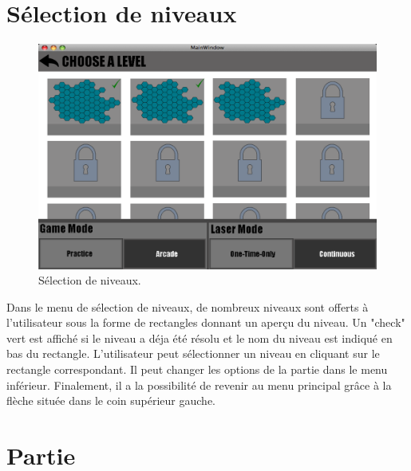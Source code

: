 \documentclass[]{article}
\begin{document}
\newpage
\section{Sélection de niveaux}\label{sec:select}

\begin{figure}[!htb]
\begin{center}
  \includegraphics[width=\textwidth]{Select.png}
  \caption{Sélection de niveaux.}\label{fig:select}
\end{center}
\end{figure}

Dans le menu de sélection de niveaux, de nombreux niveaux sont offerts à l'utilisateur sous la forme de rectangles donnant un aperçu du niveau. Un "check" vert est affiché si le niveau a déja été résolu et le nom du niveau est indiqué en bas du rectangle. L'utilisateur peut sélectionner un niveau en cliquant sur le rectangle correspondant. Il peut changer les options de la partie dans le menu inférieur. Finalement, il a la possibilité de revenir au menu principal grâce à la flèche située dans le coin supérieur gauche.

\newpage
\section{Partie}\label{sec:game}
\end{document}
